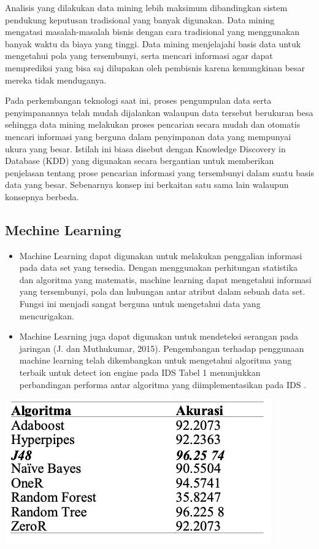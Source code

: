 \documentclass[conference]{IEEEtran}
\begin{document}
Analisis yang dilakukan data mining lebih maksimum dibandingkan sistem pendukung keputusan tradisional yang banyak digunakan. Data mining mengatasi masalah-masalah bisnis dengan cara tradisional yang menggunakan banyak waktu da biaya yang tinggi. Data mining menjelajahi basis data untuk mengetahui pola yang tersembunyi, serta mencari informasi agar dapat memprediksi yang bisa saj dilupakan oleh pembisnis karena kemungkinan besar mereka tidak menduganya.

Pada perkembangan teknologi saat ini, proses pengumpulan data serta penyimpanannya telah mudah dijalankan walaupun data tersebut berukuran besa sehingga data mining melakukan proses pencarian secara mudah dan otomatis mencari informasi yang berguna dalam penyimpanan data yang mempunyai ukura yang besar. Istilah ini biasa disebut dengan Knowledge Discovery in Database (KDD) yang digunakan secara bergantian untuk memberikan penjelasan tentang prose pencarian informasi yang tersembunyi dalam suatu basis data yang besar. Sebenarnya konsep ini berkaitan satu sama lain walaupun konsepnya berbeda.

\subsection{Mechine Learning}
\begin{itemize}
    \item Machine Learning dapat digunakan untuk melakukan penggalian informasi pada data set yang tersedia. Dengan menggunakan perhitungan statistika dan algoritma yang matematis, machine learning dapat mengetahui informasi yang tersembunyi, pola dan hubungan antar atribut dalam sebuah data set. Fungsi ini menjadi sangat berguna untuk mengetahui data yang mencurigakan.
    \item Machine Learning juga dapat digunakan untuk mendeteksi serangan pada jaringan (J. dan Muthukumar, 2015). Pengembangan terhadap penggunaan machine learning telah dikembangkan untuk mengetahui algoritma yang terbaik untuk detect ion engine pada IDS Tabel 1 menunjukkan perbandingan performa antar algoritma yang diimplementasikan pada IDS .
\end{itemize}

\begin{center}
\includegraphics[width=.4\textwidth]{picture/Gambar 2.4.1.PNG}
\end{center}
\end{document}
